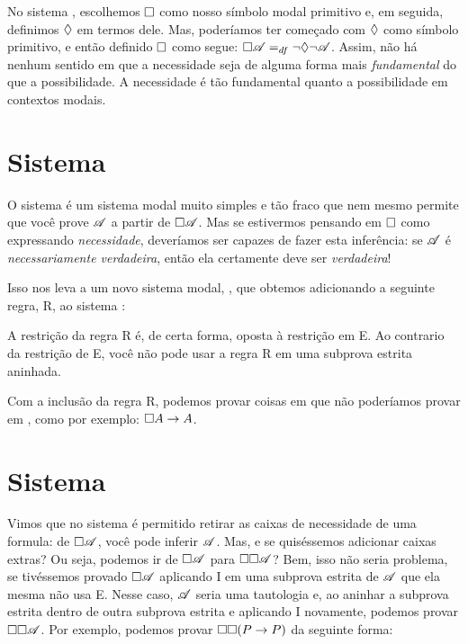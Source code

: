 No sistema   \mlK, escolhemos $\Box$ como nosso símbolo modal primitivo e, em seguida, definimos $\Diamond$ em termos dele. Mas, poderíamos ter começado com $\Diamond$ como símbolo  primitivo, e então definido $\Box$ como segue: $\Box\mathscr{A} =_{df} \neg \Diamond \neg \mathscr{A}$. 
Assim,  não há nenhum sentido em que a necessidade seja de alguma forma mais \emph{fundamental} do que a possibilidade. A necessidade é tão fundamental quanto a possibilidade em contextos modais.

\section{Sistema \mlT}
\label{T}

O sistema  \mlK{}   é um sistema modal muito simples e  tão fraco que nem mesmo permite que você prove $\mathscr{A}$  a partir de $\Box\mathscr{A}$.  Mas se estivermos pensando em $\Box$ como expressando \emph{necessidade}, deveríamos ser capazes de fazer esta inferência: se $\mathscr{A}$ é \emph{necessariamente verdadeira}, então ela certamente deve ser  \emph{verdadeira}!

Isso nos leva a um novo sistema modal, \mlT, que obtemos adicionando a
seguinte regra, R\mlT, ao sistema \mlK:

A restrição da regra R\mlT{} é, de certa forma, oposta à restrição em \ebox E.  Ao contrario da restrição de  \ebox E, você  não pode usar  a regra R\mlT{} em uma subprova estrita aninhada.

Com a inclusão da regra R\mlT{}, podemos provar coisas em \mlT{} que não poderíamos provar em \mlK, como por exemplo:  $\Box A \rightarrow A$.

\section{Sistema \mlSfour}
\label{S4}

Vimos que no sistema \mlT{} é permitido retirar as caixas de necessidade de uma formula: de $\Box \mathscr{A}$, você pode inferir $\mathscr{A}$. Mas, e se quiséssemos adicionar caixas extras?  Ou seja, podemos ir de $\Box\mathscr{A}$ para $\Box\Box\mathscr{A}$? Bem, isso não seria problema, se tivéssemos provado $\Box\mathscr{A}$ aplicando \ebox I em uma subprova estrita de $\mathscr{A}$ que ela mesma não usa \ebox E. Nesse caso, $\mathscr{A}$ seria uma tautologia e, ao aninhar a subprova estrita dentro de outra subprova estrita e aplicando \ebox I novamente, podemos provar $\Box\Box \mathscr{A}$. Por exemplo, podemos provar $\Box\Box (P\rightarrow P)$ da seguinte forma:
 

